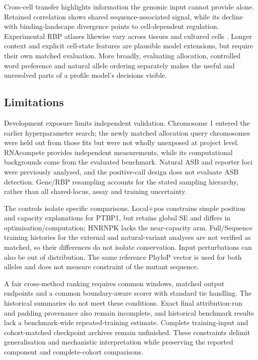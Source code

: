 \documentclass[webpdf,contemporary,large]{oup-authoring-template}
\begin{document}
Cross-cell transfer highlights information the genomic input cannot provide alone. Retained correlation shows shared sequence-associated signal, while its decline with binding-landscape divergence points to cell-dependent regulation. Experimental RBP atlases likewise vary across tissues and cultured cells \citep{perezperri2023landscapes}. Longer context and explicit cell-state features are plausible model extensions, but require their own matched evaluation. More broadly, evaluating allocation, controlled word preference and natural allele ordering separately makes the useful and unresolved parts of a profile model's decisions visible.

\subsection{Limitations}\label{subsec:limitations}

Development exposure limits independent validation. Chromosome 1 entered the earlier hyperparameter search; the newly matched allocation query chromosomes were held out from those fits but were not wholly unexposed at project level. RNAcompete provides independent measurements, while its computational backgrounds come from the evaluated benchmark. Natural ASB and reporter loci were previously analysed, and the positive-call design does not evaluate ASB detection. Gene/RBP resampling accounts for the stated sampling hierarchy, rather than all shared-locus, assay and training uncertainty.

The controls isolate specific comparisons. Local+pos constrains simple position and capacity explanations for PTBP1, but retains global SE and differs in optimisation/computation; HNRNPK lacks the near-capacity arm. Full/Sequence training histories for the external and natural-variant analyses are not verified as matched, so their differences do not isolate conservation. Input perturbations can also be out of distribution. The same reference PhyloP vector is used for both alleles and does not measure constraint of the mutant sequence.

A fair cross-method ranking requires common windows, matched output endpoints and a common boundary-aware scorer with standard tie handling. The historical summaries do not meet these conditions. Exact final attribution-run and padding provenance also remain incomplete, and historical benchmark results lack a benchmark-wide repeated-training estimate. Complete training-input and cohort-matched checkpoint archives remain unfinished. These constraints delimit generalisation and mechanistic interpretation while preserving the reported component and complete-cohort comparisons.
\end{document}
